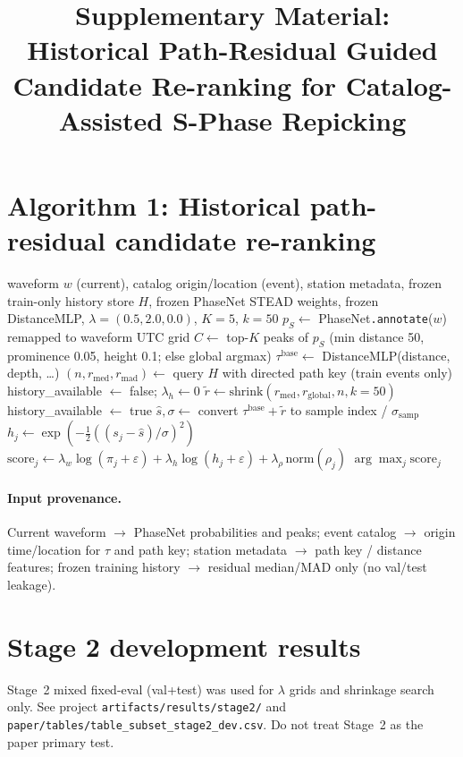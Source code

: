 \documentclass[11pt,a4paper]{article}
\title{Supplementary Material:\\ Historical Path-Residual Guided Candidate Re-ranking for Catalog-Assisted S-Phase Repicking}
\author{}
\date{}
\begin{document}
\maketitle

\section{Algorithm 1: Historical path-residual candidate re-ranking}
\begin{algorithm}[H]
\caption{Historical path-residual candidate re-ranking (S phase)}
\begin{algorithmic}[1]
\Require waveform $w$ (current), catalog origin/location (event), station metadata, frozen train-only history store $H$, frozen PhaseNet STEAD weights, frozen DistanceMLP, $\lambda=(0.5,2.0,0.0)$, $K{=}5$, $k{=}50$
\State $p_S \gets$ PhaseNet\texttt{.annotate}($w$) remapped to waveform UTC grid
\State $C \gets$ top-$K$ peaks of $p_S$ (min distance 50, prominence 0.05, height 0.1; else global argmax)
\State $\tau^{\mathrm{base}} \gets$ DistanceMLP(distance, depth, \ldots)
\State $(n,r_{\mathrm{med}},r_{\mathrm{mad}}) \gets$ query $H$ with directed path key (train events only)
  \State history\_available $\gets$ false; $\lambda_h \gets 0$
\Else
  \State $\tilde r \gets \mathrm{shrink}(r_{\mathrm{med}}, r_{\mathrm{global}}, n, k{=}50)$
  \State history\_available $\gets$ true
\EndIf
\State $\hat s,\sigma \gets$ convert $\tau^{\mathrm{base}}+\tilde r$ to sample index / $\sigma_{\mathrm{samp}}$
  \State $h_j \gets \exp(-\tfrac12((s_j-\hat s)/\sigma)^2)$
  \State $\mathrm{score}_j \gets \lambda_w\log(\pi_j+\varepsilon)+\lambda_h\log(h_j+\varepsilon)+\lambda_\rho\,\mathrm{norm}(\rho_j)$
\EndFor
\State \Return $\arg\max_j \mathrm{score}_j$
\end{algorithmic}
\end{algorithm}

\paragraph{Input provenance.}
Current waveform $\to$ PhaseNet probabilities and peaks;
event catalog $\to$ origin time/location for $\hat\tau$ and path key;
station metadata $\to$ path key / distance features;
frozen training history $\to$ residual median/MAD only (no val/test leakage).

\section{Stage 2 development results}
Stage~2 mixed fixed-eval (val+test) was used for $\lambda$ grids and shrinkage
search only. See project \texttt{artifacts/results/stage2/} and
\texttt{paper/tables/table\_subset\_stage2\_dev.csv}.
Do not treat Stage~2 as the paper primary test.
\end{document}
